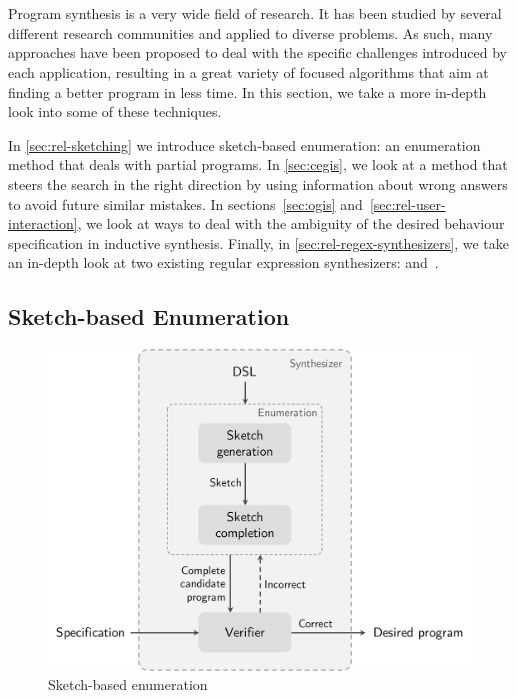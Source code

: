 \chapter{}\label{chap:program-synthesis}


Program synthesis is a very wide field of research. It has been studied by several different research communities and applied to diverse problems. As such, many approaches have been proposed to deal with the specific challenges introduced by each application, resulting in a great variety of focused algorithms that aim at finding a better program in less time. In this section, we take a more in-depth look into some of these techniques.

In \autoref{sec:rel-sketching} we introduce sketch-based enumeration: an enumeration method that deals with partial programs. In \autoref{sec:cegis}, we look at a method that steers the search in the right direction by using information about wrong answers to avoid future similar mistakes.
%
In sections~\ref{sec:ogis} and~\ref{sec:rel-user-interaction}, we look at ways to deal with the ambiguity of the desired behaviour specification in inductive synthesis.
%
Finally, in \autoref{sec:rel-regex-synthesizers}, we take an in-depth look at two existing regular expression synthesizers: \AlphaRegex and~\Regel.

\section{Sketch-based Enumeration}\label{sec:rel-sketching}

\begin{figure}
    \centering
    \includegraphics[scale=.35]{pictures/sketch.pdf}
    \caption{Sketch-based enumeration}
    \label{fig:sketch_enumeration}
\end{figure}

